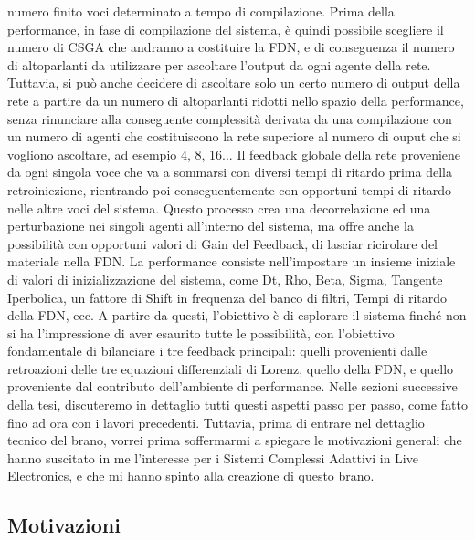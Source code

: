 numero finito voci determinato a tempo di compilazione. 
Prima della performance, in fase di compilazione del sistema,
è quindi possibile scegliere il numero di CSGA che andranno a costituire 
la FDN, e di conseguenza il numero di altoparlanti da utilizzare
per ascoltare l'output da ogni agente della rete.
Tuttavia, si può anche decidere di ascoltare solo un certo numero di output
della rete a partire da un numero di altoparlanti ridotti nello spazio della performance,
senza rinunciare alla conseguente complessità derivata da una compilazione con un
numero di agenti che costituiscono la rete superiore al numero di ouput che si vogliono ascoltare, 
ad esempio 4, 8, 16...
Il feedback globale della rete proveniene da ogni singola voce 
che va a sommarsi con diversi tempi di ritardo prima della retroiniezione,
rientrando poi conseguentemente con opportuni tempi di ritardo nelle altre voci del sistema.
Questo processo crea una decorrelazione ed una perturbazione nei singoli agenti all'interno del sistema,
ma offre anche la possibilità con opportuni valori di Gain del Feedback, 
di lasciar ricirolare del materiale nella FDN.
La performance consiste nell'impostare un insieme iniziale di valori 
di inizializzazione del sistema, come Dt, Rho, Beta, Sigma, 
Tangente Iperbolica, 
un fattore di Shift in frequenza del banco di filtri, 
Tempi di ritardo della FDN, ecc.
A partire da questi, l'obiettivo è di esplorare il sistema 
finché non si ha l'impressione di aver esaurito tutte le possibilità, 
con l'obiettivo fondamentale di bilanciare i tre feedback principali: 
quelli provenienti dalle retroazioni delle tre equazioni differenziali 
di Lorenz, quello della FDN, e quello proveniente dal contributo 
dell'ambiente di performance.
Nelle sezioni successive della tesi, 
discuteremo in dettaglio tutti questi aspetti passo per passo, 
come fatto fino ad ora con i lavori precedenti. 
Tuttavia, prima di entrare nel dettaglio tecnico del brano, 
vorrei prima soffermarmi a spiegare le motivazioni 
generali che hanno suscitato in me l'interesse per i 
Sistemi Complessi Adattivi in Live Electronics, 
e che mi hanno spinto alla creazione di questo brano. \\

\subsection{Motivazioni}
\label{Motivazioni}

